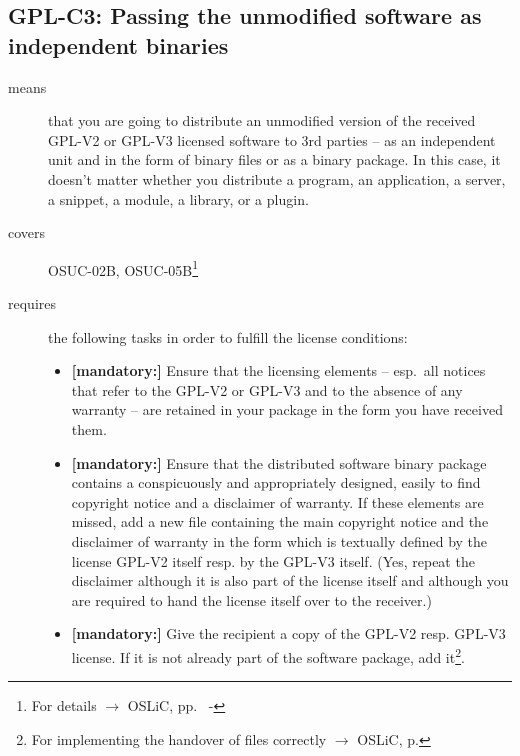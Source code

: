 \subsection{GPL-C3: Passing the unmodified software as independent binaries} 
\label{OSUC-02B-GPL} \label{OSUC-05B-GPL}

\begin{description}


\item[means] that you are going to distribute an unmodified version of the
received GPL-V2 or GPL-V3 licensed software to 3rd parties -- as an independent
unit and in the form of binary files or as a binary package. In this case, it
doesn't matter whether you distribute a program, an application, a server, a
snippet, a module, a library, or a plugin.


\item[covers] OSUC-02B, OSUC-05B\footnote{For details $\rightarrow$ OSLiC, pp.\
\pageref{OSUC-02B-DEF} - \pageref{OSUC-05B-DEF}}

\item[requires] the following tasks in order to fulfill the license conditions:
\begin{itemize}
  
  \item \textbf{[mandatory:]} Ensure that the licensing elements -- esp.\ all
  notices that refer to the GPL-V2 or GPL-V3 and to the absence of any
  warranty -- are retained in your package in the form you have received them.

  \item \textbf{[mandatory:]} Ensure that the distributed software binary
  package contains a conspicuously and appropriately designed, easily to find
  copyright notice and a disclaimer of warranty. If these elements are missed,
  add a new file containing the main copyright notice and the disclaimer of
  warranty in the form which is textually defined by the license GPL-V2 itself
  resp. by the GPL-V3 itself. (Yes, repeat the disclaimer although it is also
  part of the license itself and although you are required to hand the license
  itself over to the receiver.)
  
  \item \textbf{[mandatory:]} Give the recipient a copy of the GPL-V2 resp.
  GPL-V3 license. If it is not already part of the software package, add
  it\footnote{For implementing the handover of files correctly $\rightarrow$
  OSLiC, p. \pageref{DistributingFilesHint}}.
  

\end{itemize}
\end{description}
